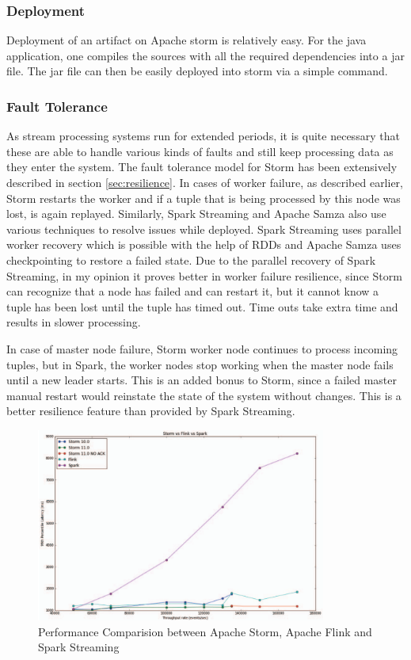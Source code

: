 \documentclass[runningheads,a4paper]{llncs}[2015/06/24]
\begin{document}
 \subsubsection{Deployment}
Deployment of an artifact on Apache storm is relatively easy. For the java application, one compiles the sources with all the required dependencies into a jar file. The jar file can then be easily deployed into storm via a simple command.
 
 \subsubsection{Fault Tolerance}
As stream processing systems run for extended periods, it is quite necessary that these are able to handle various kinds of faults and still keep processing data as they enter the system. The fault tolerance model for Storm has been extensively described in section \ref{sec:resilience}. In cases of worker failure, as described earlier, Storm restarts the worker and if a tuple that is being processed by this node was lost, is again replayed. Similarly, Spark Streaming and Apache Samza also use various techniques to resolve issues while deployed. Spark Streaming uses parallel worker recovery which is possible with the help of RDDs and Apache Samza uses checkpointing to restore a failed state. Due to the parallel recovery of Spark Streaming, in my opinion it proves better in worker failure resilience, since Storm can recognize that a node has failed and can restart it, but it cannot know a tuple has been lost until the tuple has timed out. Time outs take extra time and results in slower processing.

In case of master node failure, Storm worker node continues to process incoming tuples, but in Spark, the worker nodes stop working when the master node fails until a new leader starts. This is an added bonus to Storm, since a failed master manual restart would reinstate the state of the system without changes. This is a better resilience feature than provided by Spark Streaming.

\begin{figure}
\begin{center}
\includegraphics[width=0.85\textwidth]{comparisiongraph.png}
\caption{Performance Comparision between Apache Storm, Apache Flink and Spark Streaming \cite{benchmark}}
\label{fig:comparisiongraph}
\end{center}
\end{figure}
 
\end{document}
